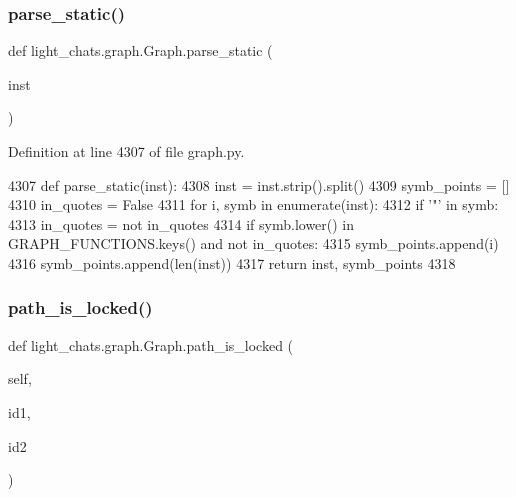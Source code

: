 \subsubsection{\texorpdfstring{parse\+\_\+static()}{parse\_static()}}
{\footnotesize\ttfamily def light\+\_\+chats.\+graph.\+Graph.\+parse\+\_\+static (\begin{DoxyParamCaption}\item[{}]{inst }\end{DoxyParamCaption})\hspace{0.3cm}{\ttfamily [static]}}



Definition at line 4307 of file graph.\+py.


\begin{DoxyCode}
4307     \textcolor{keyword}{def }parse\_static(inst):
4308         inst = inst.strip().split()
4309         symb\_points = []
4310         in\_quotes = \textcolor{keyword}{False}
4311         \textcolor{keywordflow}{for} i, symb \textcolor{keywordflow}{in} enumerate(inst):
4312             \textcolor{keywordflow}{if} \textcolor{stringliteral}{'"'} \textcolor{keywordflow}{in} symb:
4313                 in\_quotes = \textcolor{keywordflow}{not} in\_quotes
4314             \textcolor{keywordflow}{if} symb.lower() \textcolor{keywordflow}{in} GRAPH\_FUNCTIONS.keys() \textcolor{keywordflow}{and} \textcolor{keywordflow}{not} in\_quotes:
4315                 symb\_points.append(i)
4316         symb\_points.append(len(inst))
4317         \textcolor{keywordflow}{return} inst, symb\_points
4318 
\end{DoxyCode}
\mbox{\label{classlight__chats_1_1graph_1_1Graph_aeeb122366f2f098d889309fa53d19917}} 
\subsubsection{\texorpdfstring{path\+\_\+is\+\_\+locked()}{path\_is\_locked()}}
{\footnotesize\ttfamily def light\+\_\+chats.\+graph.\+Graph.\+path\+\_\+is\+\_\+locked (\begin{DoxyParamCaption}\item[{}]{self,  }\item[{}]{id1,  }\item[{}]{id2 }\end{DoxyParamCaption})}



